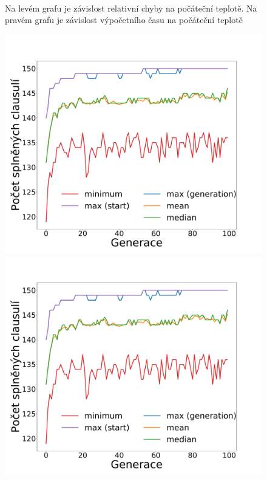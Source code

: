 \documentclass[11pt]{article}
\begin{document}
\begin{figure}
\begin{minipage}[c]{0.42\textwidth}
    \end{minipage}
    \\
   \caption{Na levém grafu je závislost relativní chyby na počáteční teplotě. Na pravém grafu je závislost výpočetního času na počáteční teplotě}\label{fig:GZNT}
\end{figure} 

\begin{figure}
	\centering
    \begin{minipage}[c]{0.325\textwidth}
        \centering\includegraphics[width=\textwidth]{img/1c.pdf} 
    \end{minipage}
    \begin{minipage}[c]{0.325\textwidth}
        \centering \includegraphics[width=\textwidth]{img/1c.pdf} 

\end{minipage}
\end{figure}
\end{document}
